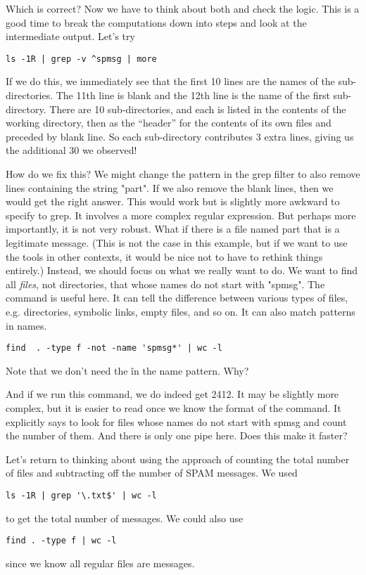 Which is correct? Now we have to think about both and
check the logic.  This is a good time to break the
computations down into steps and look  at the intermediate
output.
Let's try
\begin{verbatim}
ls -1R | grep -v ^spmsg | more
\end{verbatim}
If we do this, we immediately see that the first 10 lines are the
names of the sub-directories.  The 11th line is blank and the 12th
line is the name of the first sub-directory.  There are 10
sub-directories, and each is listed in the contents of the working
directory, then as the ``header'' for the contents of its own files
and preceded by blank line. So each sub-directory contributes 3 extra
lines, giving us the additional 30 we observed!

How do we fix this?  We might change the pattern in the grep filter to
also remove lines containing the string "part".  If we also remove the
blank lines, then we would get the right answer. This would work but
is slightly more awkward to specify to grep.  It involves a more
complex regular expression.  But perhaps more importantly, it is not
very robust.  What if there is a file named part that is a legitimate
message.  (This is not the case in this example, but if we want to use
the tools in other contexts, it would be nice not to have to rethink
things entirely.)  Instead, we should focus on what we really want to
do.  We want to find all \textit{files}, not directories, that whose
names do not start with "spmsg".  The  command is useful
here.  It can tell the difference between various types of files, e.g.
directories, symbolic links, empty files, and so on.  It can also
match patterns in names.
\begin{verbatim}
find  . -type f -not -name 'spmsg*' | wc -l
\end{verbatim}
Note that we don't need the \^ in the name pattern.
Why?  

And if we run this command, we do indeed get 2412.
It may be slightly more complex, but it is easier to read
once we know the format of the  command.
It explicitly says to look for files whose names
do not start with spmsg and count the number of them.
And there is only one pipe here. Does this  make it faster?


Let's return to thinking about using the approach of counting the
total number of files and subtracting off the number of SPAM messages.
We used 
\begin{verbatim}
ls -1R | grep '\.txt$' | wc -l
\end{verbatim}
to get the total number of messages.
We could also use
\begin{verbatim}
find . -type f | wc -l
\end{verbatim}
since we know all regular files are messages.

